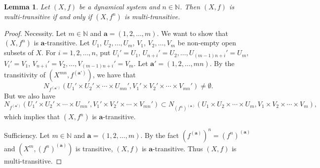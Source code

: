 \documentclass[12pt,a4paper]{amsart}
\newtheorem{lem}[thm]{Lemma}
\theoremstyle{definition}
\numberwithin{equation}{section}
\begin{document}
\begin{lem}\label{lem:mul-tran-eq}
Let $(X,f)$ be a dynamical system and $n\in\mathbb{N}$.
Then $(X,f)$ is multi-transitive if and only if $(X,f^n)$ is multi-transitive.
\end{lem}

\begin{proof}
Necessity.
Let $m\in\mathbb{N}$ and $\mathbf{a}=(1,2,\dotsc,m)$.
We want to show that $(X,f^n)$ is $\mathbf{a}$-transitive.
Let $U_1$, $U_2,\dotsc, U_m$, $V_1$, $V_2,\dotsc, V_m$ be non-empty open subsets of $X$.
For $i=1,2,\dotsc,n$, put $U_i'=U_1$, $U_{n+i}'=U_2, \dotsc, U_{(m-1)n+i}'=U_m$,
$V_i'=V_1$, $V_{n+i}'=V_2, \dotsc, V_{(m-1)n+i}'=V_m$.
Let $\mathbf{a}'=(1,2,\dotsc,mn)$.
By the transitivity of $(X^{mn},f^{(\mathbf{a}')})$, we have that
$$N_{f^{(\mathbf{a}')}}
(U_1'\times U_2'\times \dotsb \times U_{mn}',V_1'\times V_2'\times \dotsb \times V_{mn}')\neq\emptyset.$$
But we also have
$$N_{f^{(\mathbf{a}')}}(U_1'\times U_2'\times\dotsb\times U_{mn}',V_1'\times V_2'\times\dotsb\times V_{mn}')
\subset N_{(f^n)^{(\mathbf{a})}}(U_1\times U_2\times\dotsb\times U_{m},V_1\times V_2\times\dotsb\times V_{m}),$$
which implies that  $(X,f^n)$ is $\mathbf{a}$-transitive.

Sufficiency. Let $m\in\mathbb{N}$ and  $\mathbf{a}=(1,2,\dotsc,m)$.
By the fact $(f^{(\mathbf{a})})^n=(f^n)^{(\mathbf{a})}$ and $(X^m,(f^n)^{(\mathbf{a})})$ is transitive,
$(X,f)$ is $\mathbf{a}$-transitive. Thus $(X,f)$ is multi-transitive.
\end{proof}
\end{document}
